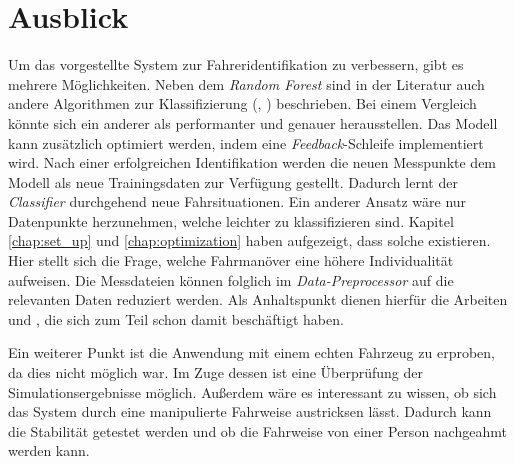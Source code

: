 \section{Ausblick}

Um das vorgestellte System zur Fahreridentifikation zu verbessern, gibt es mehrere Möglichkeiten. Neben dem \textit{Random Forest} sind in der Literatur auch andere Algorithmen zur Klassifizierung (\cite{Rebala2019}, \cite{Enev2016}) beschrieben. Bei einem Vergleich könnte sich ein anderer als performanter und genauer herausstellen. Das Modell kann zusätzlich optimiert werden, indem eine \textit{Feedback}-Schleife implementiert wird. Nach einer erfolgreichen Identifikation werden die neuen Messpunkte dem Modell als neue Trainingsdaten zur Verfügung gestellt. Dadurch lernt der \textit{Classifier} durchgehend neue Fahrsituationen. Ein anderer Ansatz wäre nur Datenpunkte herzunehmen, welche leichter zu klassifizieren sind. Kapitel \ref{chap:set_up} und \ref{chap:optimization} haben aufgezeigt, dass solche existieren. Hier stellt sich die Frage, welche Fahrmanöver eine höhere Individualität aufweisen. Die Messdateien können folglich im \textit{Data-Preprocessor} auf die relevanten Daten reduziert werden. Als Anhaltspunkt dienen hierfür die Arbeiten \cite{Gahr2018} und \cite{Hallac2016}, die sich zum Teil schon damit beschäftigt haben.

Ein weiterer Punkt ist die Anwendung mit einem echten Fahrzeug zu erproben, da dies nicht möglich war. Im Zuge dessen ist eine Überprüfung der Simulationsergebnisse möglich. Außerdem wäre es interessant zu wissen, ob sich das System durch eine manipulierte Fahrweise austricksen lässt. Dadurch kann die Stabilität getestet werden und ob die Fahrweise von einer Person nachgeahmt werden kann.